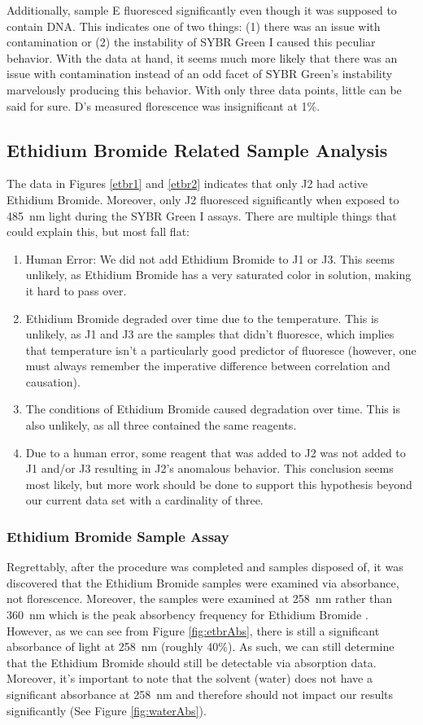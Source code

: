\documentclass[a4paper,xcolor=table]{article}
\begin{document}
Additionally, sample E fluoresced significantly even though it was supposed to contain DNA. This indicates one of two things: (1) there was an issue with contamination or (2) the instability of SYBR Green I caused this peculiar behavior. With the data at hand, it seems much more likely that there was an issue with contamination instead of an odd facet of SYBR Green's instability marvelously producing this behavior. With only three data points, little can be said for sure. D's measured florescence was insignificant at 1\%.

\subsection{Ethidium Bromide Related Sample Analysis}

The data in Figures \ref{etbr1} and \ref{etbr2} indicates that only J2 had active Ethidium Bromide. Moreover, only J2 fluoresced significantly when exposed to \SI{485}{\nano\m} light during the SYBR Green I assays. There are multiple things that could explain this, but most fall flat:
\begin{enumerate}
\item{Human Error: We did not add Ethidium Bromide to J1 or J3. This seems unlikely, as Ethidium Bromide has a very saturated color in solution, making it hard to pass over.}
\item{Ethidium Bromide degraded over time due to the temperature. This is unlikely, as J1 and J3 are the samples that didn't fluoresce, which implies that temperature isn't a particularly good predictor of fluoresce (however, one must always remember the imperative difference between correlation and causation).}
\item{The conditions of Ethidium Bromide caused degradation over time. This is also unlikely, as all three contained the same reagents.}
\item{Due to a human error, some reagent that was added to J2 was not added to J1 and/or J3 resulting in J2's anomalous behavior. This conclusion seems most likely, but more work should be done to support this hypothesis beyond our current data set with a cardinality of three.}
\end{enumerate}
\subsubsection{Ethidium Bromide Sample Assay}
\label{ssec:etbrAssay}
Regrettably, after the procedure was completed and samples disposed of, it was discovered that the Ethidium Bromide samples were examined via absorbance, not florescence. Moreover, the samples were examined at \SI{258}{\nano\m} rather than \SI{360}{\nano\m} which is the peak absorbency frequency for Ethidium Bromide \cite{etbrSpec}. However, as we can see from Figure \ref{fig:etbrAbs}, there is still a significant absorbance of light at \SI{258}{\nano\m} (roughly 40\%). As such, we can still determine that the Ethidium Bromide should still be detectable via absorption data. Moreover, it's important to note that the solvent (water) does not have a significant absorbance at \SI{258}{\nano\m} \cite{uvWaterAbs} and therefore should not impact our results significantly (See Figure \ref{fig:waterAbs}).
\end{document}
